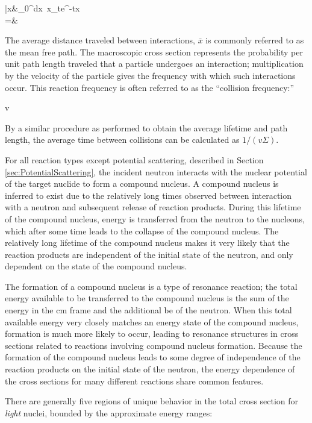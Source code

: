 \beqa
\bar{x}\equiv&\int_0^\infty dx\ x\Sigma_te^{-\Sigma tx}\\
=&\ 
\eeqa

The average distance traveled between interactions, \(\bar{x}\) is commonly referred to as the mean free path. The macroscopic cross section represents the probability per unit path length traveled that a particle undergoes an interaction; multiplication by the velocity of the particle gives the frequency with which such interactions occur. This reaction frequency is often referred to as the ``collision frequency:''

\beq
{}\equiv v\Sigma
\eeq

By a similar procedure as performed to obtain the average lifetime and path length, the average time between collisions can be calculated as \(1/(v\Sigma)\).

For all reaction types except potential scattering, described in Section \ref{sec:PotentialScattering}, the incident neutron interacts with the nuclear potential of the target nuclide to form a compound nucleus. A compound nucleus is inferred to exist due to the relatively long times observed between interaction with a neutron and subsequent release of reaction products. During this lifetime of the compound nucleus, energy is transferred from the neutron to the nucleons, which after some time leads to the collapse of the compound nucleus. The relatively long lifetime of the compound nucleus makes it very likely that the reaction products are independent of the initial state of the neutron, and only dependent on the state of the compound nucleus. 

The formation of a compound nucleus is a type of resonance reaction; the total energy available to be transferred to the compound nucleus is the sum of the energy in the \gls{cm} frame and the additional \gls{be} of the neutron. When this total available energy very closely matches an energy state of the compound nucleus, formation is much more likely to occur, leading to resonance structures in cross sections related to reactions involving compound nucleus formation. Because the formation of the compound nucleus leads to some degree of independence of the reaction products on the initial state of the neutron, the energy dependence of the cross sections for many different reactions share common features. 

There are generally five regions of unique behavior in the total cross section for {\it light} nuclei, bounded by the approximate energy ranges:

